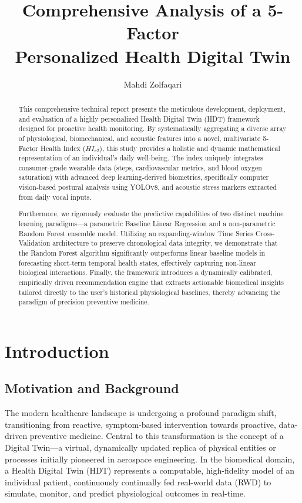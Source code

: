 \documentclass[11pt,a4paper]{article}
\title{Comprehensive Analysis of a 5-Factor \\ Personalized Health Digital Twin}
\author{Mahdi Zolfaqari}
\date{}
\begin{document}
\maketitle

\begin{abstract}
This comprehensive technical report presents the meticulous development, deployment, and evaluation of a highly personalized Health Digital Twin (HDT) framework designed for proactive health monitoring. By systematically aggregating a diverse array of physiological, biomechanical, and acoustic features into a novel, multivariate 5-Factor Health Index ($HI_{v2}$), this study provides a holistic and dynamic mathematical representation of an individual's daily well-being. The index uniquely integrates consumer-grade wearable data (steps, cardiovascular metrics, and blood oxygen saturation) with advanced deep learning-derived biometrics, specifically computer vision-based postural analysis using YOLOv8, and acoustic stress markers extracted from daily vocal inputs. 

Furthermore, we rigorously evaluate the predictive capabilities of two distinct machine learning paradigms—a parametric Baseline Linear Regression and a non-parametric Random Forest ensemble model. Utilizing an expanding-window Time Series Cross-Validation architecture to preserve chronological data integrity, we demonstrate that the Random Forest algorithm significantly outperforms linear baseline models in forecasting short-term temporal health states, effectively capturing non-linear biological interactions. Finally, the framework introduces a dynamically calibrated, empirically driven recommendation engine that extracts actionable biomedical insights tailored directly to the user's historical physiological baselines, thereby advancing the paradigm of precision preventive medicine.
\end{abstract}

\section{Introduction}
\subsection{Motivation and Background}
The modern healthcare landscape is undergoing a profound paradigm shift, transitioning from reactive, symptom-based intervention towards proactive, data-driven preventive medicine. Central to this transformation is the concept of a Digital Twin—a virtual, dynamically updated replica of physical entities or processes initially pioneered in aerospace engineering. In the biomedical domain, a Health Digital Twin (HDT) represents a computable, high-fidelity model of an individual patient, continuously continually fed real-world data (RWD) to simulate, monitor, and predict physiological outcomes in real-time.
\end{document}
